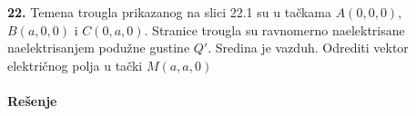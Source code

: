 \textbf{\Large 22.} Temena trougla prikazanog na slici 22.1 su u ta\v{c}kama $A(0, 0, 0)$, $B(a, 0, 0)$ i $C(0, a, 0)$. Stranice trougla su ravnomerno naelektrisane naelektrisanjem podu\v{z}ne gustine $Q'$. Sredina je vazduh. Odrediti vektor elektri\v{c}nog polja u ta\v{c}ki $M(a, a, 0)$
\\\\
\textbf{\Large Re\v{s}enje}
